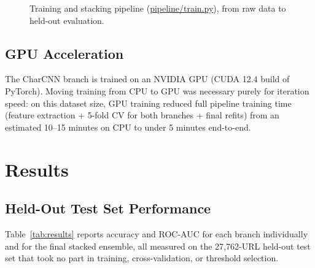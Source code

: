 \documentclass[11pt,a4paper]{report}
\begin{document}
\begin{figure}[H]
\centering
{}
\caption{Training and stacking pipeline (\url{pipeline/train.py}), from raw data to held-out evaluation.}
\label{fig:training}
\end{figure}

\section{GPU Acceleration}
The CharCNN branch is trained on an NVIDIA GPU (CUDA 12.4 build of PyTorch). Moving
training from CPU to GPU was necessary purely for iteration speed: on this
dataset size, GPU training reduced full pipeline training time (feature extraction +
5-fold CV for both branches + final refits) from an estimated 10--15 minutes on CPU
to under 5 minutes end-to-end.

\chapter{Results}

\section{Held-Out Test Set Performance}
Table~\ref{tab:results} reports accuracy and ROC-AUC for each branch individually
and for the final stacked ensemble, all measured on the 27{,}762-URL held-out test
set that took no part in training, cross-validation, or threshold selection.
\end{document}
